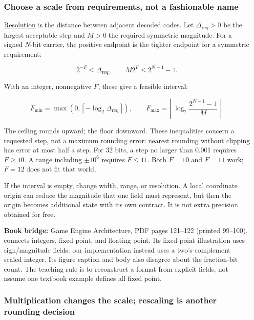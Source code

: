 \subsubsection{Choose a scale from requirements, not a fashionable name}\label{01-foundations-i-ch001-choose-a-scale-from-requirements-not-a-fashionable-name}

\hypertarget{01-foundations-i-ch001-choose-a-scale-from-requirements-not-a-fashionable-name}{}

\hyperref[appendix-ceb4c4a9b5a1]{Resolution} is the distance between adjacent decoded codes. Let \(\Delta_{\mathrm{req}}>0\) be the largest acceptable step and \(M>0\) the required symmetric magnitude. For a signed \(N\)-bit carrier, the positive endpoint is the tighter endpoint for a symmetric requirement:

\[
2^{-F}\le\Delta_{\mathrm{req}},
\qquad
M2^F\le2^{N-1}-1.
\]

With an integer, nonnegative \(F\), these give a feasible interval:

\[
F_{\min}=\max\!\left(0,\left\lceil-\log_2\Delta_{\mathrm{req}}\right\rceil\right),
\qquad
F_{\max}=\left\lfloor\log_2\frac{2^{N-1}-1}{M}\right\rfloor.
\]

The ceiling rounds upward; the floor downward. These inequalities concern a requested step, not a maximum rounding error: nearest rounding without clipping has error at most half a step. For 32 bits, a step no larger than 0.001 requires \(F\ge10\). A range including \(\pm10^6\) requires \(F\le11\). Both \(F=10\) and \(F=11\) work; \(F=12\) does not fit that world.

If the interval is empty, change width, range, or resolution. A local coordinate origin can reduce the magnitude that one field must represent, but then the origin becomes additional state with its own contract. It is not extra precision obtained for free.

\textbf{Book bridge:} Game Engine Architecture, PDF pages 121--122 (printed 99--100), connects integers, fixed point, and floating point. Its fixed-point illustration uses sign/magnitude fields; our implementation instead uses a two's-complement scaled integer. Its figure caption and body also disagree about the fraction-bit count. The teaching rule is to reconstruct a format from explicit fields, not assume one textbook example defines all fixed point.

\subsubsection{Multiplication changes the scale; rescaling is another rounding decision}\label{01-foundations-i-ch001-multiplication-changes-the-scale-rescaling-is-another-rounding-decision}

